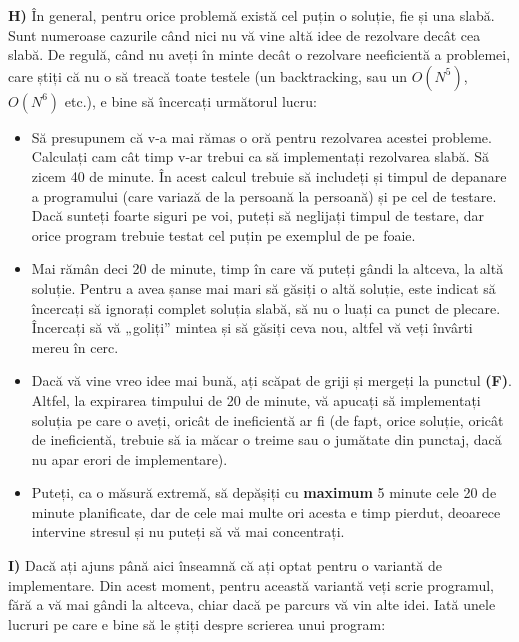 {\bf H)} În general, pentru orice problemă există cel puțin o soluție, fie și
una slabă. Sunt numeroase cazurile când nici nu vă vine altă idee de rezolvare
decât cea slabă. De regulă, când nu aveți în minte decât o rezolvare
neeficientă a problemei, care știți că nu o să treacă toate testele (un
backtracking, sau un $O(N^5)$, $O(N^6)$ etc.), e bine să încercați următorul
lucru:

\begin{itemize}

\item Să presupunem că v-a mai rămas o oră pentru rezolvarea acestei
  probleme. Calculați cam cât timp v-ar trebui ca să implementați rezolvarea
  slabă. Să zicem 40 de minute. În acest calcul trebuie să includeți și timpul
  de depanare a programului (care variază de la persoană la persoană) și pe
  cel de testare. Dacă sunteți foarte siguri pe voi, puteți să neglijați
  timpul de testare, dar orice program trebuie testat cel puțin pe exemplul de
  pe foaie.
  
\item Mai rămân deci 20 de minute, timp în care vă puteți gândi la altceva, la
  altă soluție. Pentru a avea șanse mai mari să găsiți o altă soluție, este
  indicat să încercați să ignorați complet soluția slabă, să nu o luați ca
  punct de plecare. Încercați să vă „goliți” mintea și să găsiți ceva nou,
  altfel vă veți învârti mereu în cerc.
  
\item Dacă vă vine vreo idee mai bună, ați scăpat de griji și mergeți la
  punctul {\bf (F)}. Altfel, la expirarea timpului de 20 de minute, vă apucați
  să implementați soluția pe care o aveți, oricât de ineficientă ar fi (de
  fapt, orice soluție, oricât de ineficientă, trebuie să ia măcar o treime sau
  o jumătate din punctaj, dacă nu apar erori de implementare).
  
\item Puteți, ca o măsură extremă, să depășiți cu {\bf maximum} 5 minute cele
  20 de minute planificate, dar de cele mai multe ori acesta e timp pierdut,
  deoarece intervine stresul și nu puteți să vă mai concentrați.

\end{itemize}

{\bf I)} Dacă ați ajuns până aici înseamnă că ați optat pentru o variantă de
implementare. Din acest moment, pentru această variantă veți scrie programul,
fără a vă mai gândi la altceva, chiar dacă pe parcurs vă vin alte idei. Iată
unele lucruri pe care e bine să le știți despre scrierea unui program:

